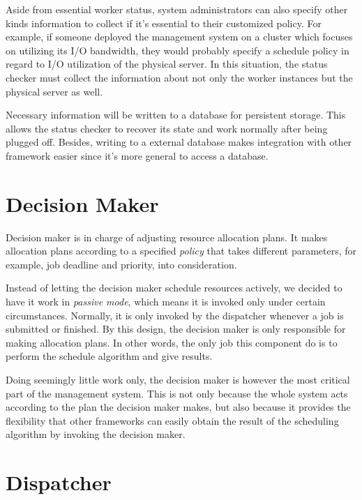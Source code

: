 Aside from essential worker status, system administrators can also
specify other kinds information to collect if it's essential to  their
customized policy.
For example, if someone deployed the management system on a cluster
which focuses on utilizing its I/O bandwidth, they would probably
specify a schedule policy in regard to I/O utilization of the physical
server.
In this situation, the status checker must collect the information about
not only the worker instances but the physical server as well.

Necessary information will be written to a database for persistent
storage.
This allows the status checker to recover its state and work normally
after being plugged off.
Besides, writing to a external database makes integration with other
framework easier since it's more general to access a database.

\section{Decision Maker}

Decision maker is in charge of adjusting resource allocation plans.
It
makes allocation plans according to a specified \emph{policy} that takes
different parameters, for example, job deadline and priority, into
consideration. 

Instead of letting the decision maker schedule resources actively, we
decided to have it work in \emph{passive mode}, which means it is
invoked only under certain circumstances.
Normally, it is only invoked by the dispatcher whenever a job is
submitted or finished.
By this design, the decision maker is only responsible for making
allocation plans.
In other words, the only job this component do is to perform the
schedule algorithm and give results.


Doing seemingly little work only, the decision maker is however the most
critical part of the management system.
This is not only because the whole system acts according to the plan the
decision maker makes, but also because it provides the flexibility that
other frameworks can easily obtain the result of the scheduling
algorithm by invoking the decision maker.

\section{Dispatcher}

